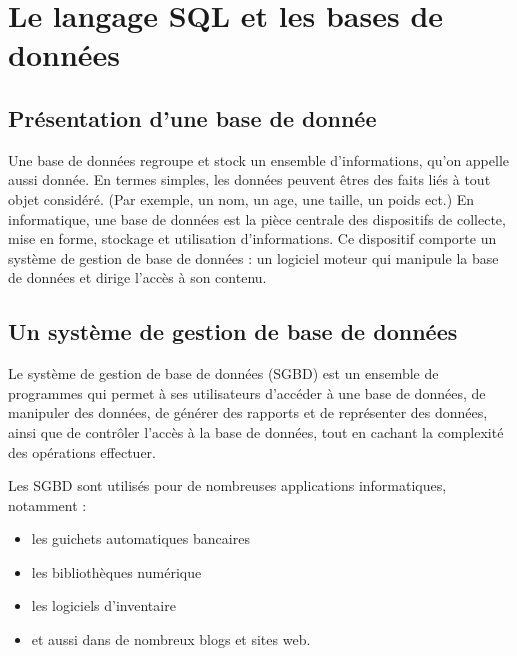 \documentclass[oneside,13pt,a4paper]{report}
\begin{document}

    \chapter{Le langage SQL et les bases de données}


        \section{Présentation d’une base de donnée}

            Une base de données regroupe et stock un ensemble d’informations, qu'on appelle aussi donnée.
            En termes simples, les données peuvent êtres des faits liés à tout objet considéré.
            (Par exemple, un nom, un age, une taille, un poids ect.)
            En informatique, une base de données est la pièce centrale des dispositifs de collecte, mise en forme, stockage et utilisation d'informations.
            Ce dispositif comporte un système de gestion de base de données : un logiciel moteur qui manipule la base de données et dirige l'accès à son contenu.



        \section{Un système de gestion de base de données}

            Le système de gestion de base de données (SGBD) est un ensemble de programmes qui permet à ses utilisateurs d'accéder à une base de données, de manipuler des données, de générer des rapports et de représenter des données, 
            ainsi que de contrôler l'accès à la base de données, tout en cachant la complexité des opérations effectuer.

            Les SGBD sont utilisés pour de nombreuses applications informatiques, notamment : 
            \begin{itemize}
                \item les guichets automatiques bancaires
                \item les bibliothèques numérique
                \item les logiciels d'inventaire
                \item et aussi dans de nombreux blogs et sites web.
            \end{itemize}
\end{document}
